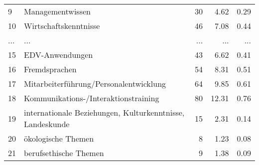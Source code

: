 \begin{longtable}{lXrrr}
        9 & \multicolumn{1}{X}{Managementwissen} & %
          \num{30} &
          \num[round-mode=places,round-precision=2]{4,62} &
          \num[round-mode=places,round-precision=2]{0,29} \\
        10 & \multicolumn{1}{X}{Wirtschaftskenntnisse} & %
          \num{46} &
          \num[round-mode=places,round-precision=2]{7,08} &
          \num[round-mode=places,round-precision=2]{0,44} \\
       ... & ... & ... & ... & ... \\
        15 & \multicolumn{1}{X}{EDV-Anwendungen} & %
          \num{43} &
          \num[round-mode=places,round-precision=2]{6,62} &
          \num[round-mode=places,round-precision=2]{0,41} \\

        16 & \multicolumn{1}{X}{Fremdsprachen} & %
          \num{54} &
          \num[round-mode=places,round-precision=2]{8,31} &
          \num[round-mode=places,round-precision=2]{0,51} \\

        17 & \multicolumn{1}{X}{Mitarbeiterführung/Personalentwicklung} & %
          \num{64} &
          \num[round-mode=places,round-precision=2]{9,85} &
          \num[round-mode=places,round-precision=2]{0,61} \\

        18 & \multicolumn{1}{X}{Kommunikations-/Interaktionstraining} & %
          \num{80} &
          \num[round-mode=places,round-precision=2]{12,31} &
          \num[round-mode=places,round-precision=2]{0,76} \\

        19 & \multicolumn{1}{X}{internationale Beziehungen, Kulturkenntnisse, Landeskunde} & %
          \num{15} &
          \num[round-mode=places,round-precision=2]{2,31} &
          \num[round-mode=places,round-precision=2]{0,14} \\

        20 & \multicolumn{1}{X}{ökologische Themen} & %
          \num{8} &
          \num[round-mode=places,round-precision=2]{1,23} &
          \num[round-mode=places,round-precision=2]{0,08} \\

        21 & \multicolumn{1}{X}{berufsethische Themen} & %
          \num{9} &
          \num[round-mode=places,round-precision=2]{1,38} &
          \num[round-mode=places,round-precision=2]{0,09} \\


\end{longtable}
